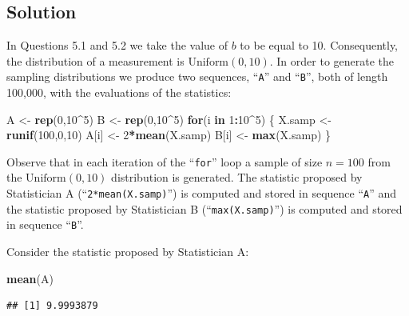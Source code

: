 \documentclass[]{krantz}
\makeatletter
\newenvironment{Shaded}{\begin{snugshade}}{\end{snugshade}}
\newcommand{\ControlFlowTok}[1]{\textcolor[rgb]{0.13,0.29,0.53}{\textbf{#1}}}
\newcommand{\DecValTok}[1]{\textcolor[rgb]{0.00,0.00,0.81}{#1}}
\newcommand{\KeywordTok}[1]{\textcolor[rgb]{0.13,0.29,0.53}{\textbf{#1}}}
\newcommand{\NormalTok}[1]{#1}
\newcommand{\OperatorTok}[1]{\textcolor[rgb]{0.81,0.36,0.00}{\textbf{#1}}}
\newcommand{\StringTok}[1]{\textcolor[rgb]{0.31,0.60,0.02}{#1}}
\newenvironment{kframe}{%
\medskip{}
\setlength{\fboxsep}{.8em}
 \def\at@end@of@kframe{}%
 \ifinner\ifhmode%
  \def\at@end@of@kframe{\end{minipage}}%
  \begin{minipage}{\columnwidth}%
 \fi\fi%
 \def\FrameCommand##1{\hskip\@totalleftmargin \hskip-\fboxsep
 \colorbox{shadecolor}{##1}\hskip-\fboxsep
     \hskip-\linewidth \hskip-\@totalleftmargin \hskip\columnwidth}%
 \MakeFramed {\advance\hsize-\width
   \@totalleftmargin\z@ \linewidth\hsize
   \@setminipage}}%
 {\par\unskip\endMakeFramed%
 \at@end@of@kframe}
\renewenvironment{Shaded}{\begin{kframe}}{\end{kframe}}
\theoremstyle{definition}
\theoremstyle{definition}
\theoremstyle{definition}
\theoremstyle{remark}
\makeatother
\begin{document}
\hypertarget{solution-4}{%
\subsection*{Solution}\label{solution-4}}


In Questions 5.1 and 5.2 we take the value of \(b\) to be equal to 10.
Consequently, the distribution of a measurement is
\(\mbox{Uniform}(0,10)\). In order to generate the sampling distributions
we produce two sequences, ``\texttt{A}'' and ``\texttt{B}'', both of length 100,000, with
the evaluations of the statistics:

\begin{Shaded}
\begin{Highlighting}[]
\NormalTok{A <-}\StringTok{ }\KeywordTok{rep}\NormalTok{(}\DecValTok{0}\NormalTok{,}\DecValTok{10}\OperatorTok{^}\DecValTok{5}\NormalTok{)}
\NormalTok{B <-}\StringTok{ }\KeywordTok{rep}\NormalTok{(}\DecValTok{0}\NormalTok{,}\DecValTok{10}\OperatorTok{^}\DecValTok{5}\NormalTok{)}
\ControlFlowTok{for}\NormalTok{(i }\ControlFlowTok{in} \DecValTok{1}\OperatorTok{:}\DecValTok{10}\OperatorTok{^}\DecValTok{5}\NormalTok{) \{}
\NormalTok{  X.samp <-}\StringTok{ }\KeywordTok{runif}\NormalTok{(}\DecValTok{100}\NormalTok{,}\DecValTok{0}\NormalTok{,}\DecValTok{10}\NormalTok{)}
\NormalTok{  A[i] <-}\StringTok{ }\DecValTok{2}\OperatorTok{*}\KeywordTok{mean}\NormalTok{(X.samp)}
\NormalTok{  B[i] <-}\StringTok{ }\KeywordTok{max}\NormalTok{(X.samp)}
\NormalTok{\}}
\end{Highlighting}
\end{Shaded}

Observe that in each iteration of the ``\texttt{for}'' loop a sample of size
\(n=100\) from the \(\mbox{Uniform}(0,10)\) distribution is generated. The
statistic proposed by Statistician A (``\texttt{2*mean(X.samp)}'') is computed
and stored in sequence ``\texttt{A}'' and the statistic proposed by Statistician
B (``\texttt{max(X.samp)}'') is computed and stored in sequence ``\texttt{B}''.

Consider the statistic proposed by Statistician A:

\begin{Shaded}
\begin{Highlighting}[]
\KeywordTok{mean}\NormalTok{(A)}
\end{Highlighting}
\end{Shaded}

\begin{verbatim}
## [1] 9.9993879
\end{verbatim}
\end{document}
